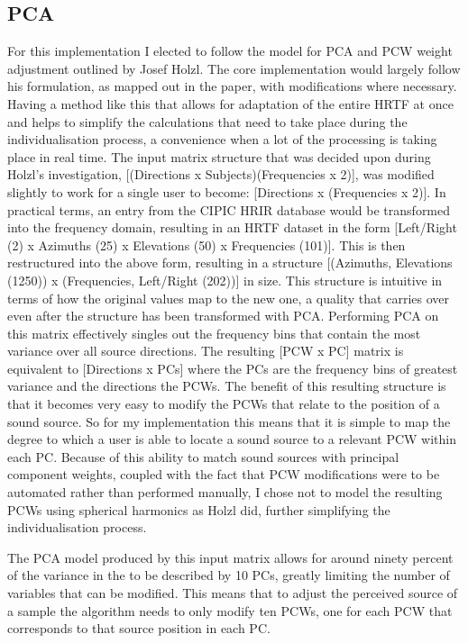\subsection{PCA}
For this implementation I elected to follow the model for PCA and PCW weight adjustment outlined by Josef Holzl\citep{Holzl2014a}. The core implementation would largely follow his formulation, as mapped out in the paper, with modifications where necessary. Having a method like this that allows for adaptation of the entire HRTF at once and helps to simplify the calculations that need to take place during the individualisation process, a convenience when a lot of the processing is taking place in real time. The input matrix structure that was decided upon during Holzl's investigation, [(Directions x Subjects)(Frequencies x 2)], was modified slightly to work for a single user to become: [Directions x (Frequencies x 2)]. In practical terms, an entry from the CIPIC HRIR database would be transformed into the frequency domain, resulting in an HRTF dataset in the form [Left/Right (2) x Azimuths (25) x Elevations (50) x Frequencies (101)]. This is then restructured into the above form, resulting in a structure [(Azimuths, Elevations (1250)) x (Frequencies, Left/Right (202))] in size. This structure is intuitive in terms of how the original values map to the new one, a quality that carries over even after the structure has been transformed with PCA. Performing PCA on this matrix effectively singles out the frequency bins that contain the most variance over all source directions. The resulting [PCW x PC] matrix is equivalent to [Directions x PCs] where the PCs are the frequency bins of greatest variance and the directions the PCWs. The benefit of this resulting structure is that it becomes very easy to modify the PCWs that relate to the position of a sound source. So for my implementation this means that it is simple to map the degree to which a user is able to locate a sound source to a relevant PCW within each PC. Because of this ability to match sound sources with principal component weights, coupled with the fact that PCW modifications were to be automated rather than performed manually, I chose not to model the resulting PCWs using spherical harmonics as Holzl did, further simplifying the individualisation process. 

The PCA model produced by this input matrix allows for around ninety percent of the variance in the to be described by 10 PCs, greatly limiting the number of variables that can be modified. This means that to adjust the perceived source of a sample the algorithm needs to only modify ten PCWs, one for each PCW that corresponds to that source position in each PC. 

